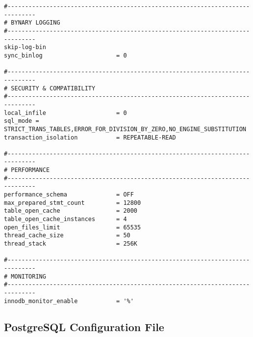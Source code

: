\begin{lstlisting}[caption={MariaDB configuration file}, label={lst:mariadb-config}]
#------------------------------------------------------------------------------
# BYNARY LOGGING
#------------------------------------------------------------------------------
skip-log-bin
sync_binlog                     = 0

#------------------------------------------------------------------------------
# SECURITY & COMPATIBILITY
#------------------------------------------------------------------------------
local_infile                    = 0
sql_mode = STRICT_TRANS_TABLES,ERROR_FOR_DIVISION_BY_ZERO,NO_ENGINE_SUBSTITUTION
transaction_isolation           = REPEATABLE-READ

#------------------------------------------------------------------------------
# PERFORMANCE
#------------------------------------------------------------------------------
performance_schema              = OFF
max_prepared_stmt_count         = 12800
table_open_cache                = 2000
table_open_cache_instances      = 4
open_files_limit                = 65535
thread_cache_size               = 50
thread_stack                    = 256K

#------------------------------------------------------------------------------
# MONITORING
#------------------------------------------------------------------------------
innodb_monitor_enable           = '%'
\end{lstlisting}

\pagebreak

\subsection{PostgreSQL Configuration File}
\label{sec:postgresql-config}

